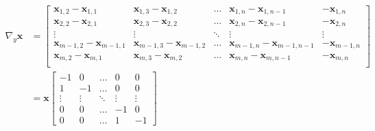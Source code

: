 \documentclass[12pt]{article}
\begin{document}
\begin{equation}
  \begin{aligned}
  \nabla_{y} \mathbf{x} &= \begin{bmatrix}

    \mathbf{x}_{1,2} - \mathbf{x}_{1,1} & \mathbf{x}_{1,3} - \mathbf{x}_{1,2} & \ldots & \mathbf{x}_{1,n} - \mathbf{x}_{1,n-1} & \mathbf- \mathbf{x}_{1,n} \\
    \mathbf{x}_{2,2} - \mathbf{x}_{2,1} & \mathbf{x}_{2,3} - \mathbf{x}_{2,2} & \ldots & \mathbf{x}_{2,n} - \mathbf{x}_{2,n-1} & \mathbf- \mathbf{x}_{2,n}  \\
    \vdots & \vdots & \ddots & \vdots & \vdots \\
    \mathbf{x}_{m-1,2} - \mathbf{x}_{m-1,1} & \mathbf{x}_{m-1,3} - \mathbf{x}_{m-1,2} & \ldots & \mathbf{x}_{m-1,n} - \mathbf{x}_{m-1,n-1} & - \mathbf{x}_{m-1,n} \\
    \mathbf{x}_{m,2} - \mathbf{x}_{m,1} & \mathbf{x}_{m,3} - \mathbf{x}_{m,2} & \ldots & \mathbf{x}_{m,n} - \mathbf{x}_{m,n-1} & \mathbf- \mathbf{x}_{m,n} \\
  \end{bmatrix} \\
  &=  \mathbf{x} \begin{bmatrix}
    -1 & 0 & \ldots & 0 & 0 \\
    1 & -1 & \ldots & 0 & 0 \\
    \vdots & \vdots & \ddots & \vdots & \vdots \\
    0 & 0 & \ldots & -1 & 0 \\
    0 & 0 & \ldots & 1 & -1
    \end{bmatrix}
  \end{aligned}
\end{equation}
\end{document}

